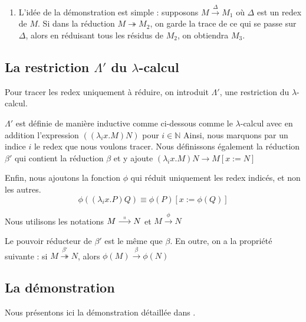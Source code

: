 \documentclass[11pt]{book}
\begin{document}
\begin{enumerate}
\begin{center}
\end{center}

\item L'idée de la démonstration est simple : supposons $M \stackrel{\Delta}{\rightarrow} M_1  $ où
$\Delta$ est un redex de $M$. Si dans la réduction $M\twoheadrightarrow M_2$, on garde la trace de ce qui se passe
sur $\Delta$, alors en réduisant tous les résidus de $M_2$, on obtiendra $M_3$.
\end{enumerate}

\subsection{La restriction $\Lambda '$ du $\lambda$-calcul}
Pour tracer les redex uniquement à réduire, on introduit $\Lambda '$, une restriction du $\lambda$-calcul.


$\Lambda '$ est définie de manière inductive comme ci-dessous comme le $\lambda$-calcul avec en addition
l'expression $((\lambda _i x.M)N)$ pour $i \in \mathbb{N}$
Ainsi, nous marquons par un indice $i$ le redex que nous voulons tracer.
Nous définissons également la réduction $\beta '$  qui contient la réduction $\beta$ et y ajoute 
$(\lambda_i x.M)N \rightarrow M [x:=N]$

Enfin, nous ajoutons la fonction $\phi$ qui réduit uniquement les redex indicés, et non les autres.
$$\phi ((\lambda _i x.P)Q) \equiv \phi (P) [x:=\phi(Q)]$$

Nous utilisons les notations $M\stackrel{\shortparallel }{\longrightarrow} N$
et $M\stackrel{\phi } {\longrightarrow}N$

Le pouvoir réducteur de $\beta '$ est le même que $\beta$.
En outre, on a la propriété suivante : si $M \stackrel{\beta '}{\twoheadrightarrow} N$,
alors   $\phi(M) \stackrel{\beta}{\longrightarrow} \phi (N)$ 

\subsection{La démonstration}
Nous présentons ici la démonstration détaillée dans \cite{baren_bible}.
\end{document}
